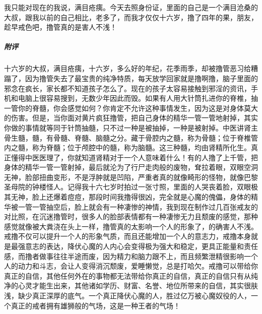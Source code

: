 \begin{case}
    我只能对现在的我说，满目疮痍。今天去照身份证，里面的自己是一个满目沧桑的大叔，跟我以前的自己相比，老多了，而我才仅仅十六岁，撸了四年的果，朋友，趁早戒色吧，撸管真的是害人不浅！
    \subparagraph{附评} 十六岁的大叔，满目疮痍，十六岁，多么好的年纪，花季雨季，却被撸管恶习给糟蹋了，因为撸管失去了最宝贵的纯净特质，每天放学回家就是撸啊撸，脑子里面的邪念在疯长，家长都不知道孩子怎么了。现在的孩子太容易接触到邪淫的资讯，手机和电脑上很容易搜到，无数少年因此而毁。如果有人用大针筒扎进你的脊椎，抽一管你的脊髓，你会感觉如何？你肯定不允许这种事情发生，因为这是对身体莫大的伤害。但是，当你面对黄片疯狂撸管，把自己身体的精华一管一管地射掉，其实你做的事情就等同于针筒抽髓，只不过一种是被抽掉，一种是被射掉。中医讲肾主骨生髓，髓，有骨髓、脊髓、脑髓之分。藏于骨腔内之髓，称为骨髓；位于脊椎管内之髓，称为脊髓；位于颅腔中的髓，称为脑髓。这三种髓，均由肾精所化生。真正懂得中医医理了，你就知道肾精对于一个人意味着什么！有的人撸了上千管，把身体的精华一管一管射掉，最后就沦为了行尸走肉般的废物，耷拉着眼，双眼空洞无神，脸部扭曲变形，不是浮肿就是凹陷，严重者真的就像畸形的怪物，就像巴黎圣母院的钟楼怪人。记得我十六七岁时拍过一张寸照，里面的人哭丧着脸，双眼极其无神，脸上还爆着痘痘，那段时间我撸得很凶，完全就是心魔的傀儡，身体的精华被一管一管抽空后，脸上就会有一种凄惨的神情，我到现在制作过几百张戒友的对比照，在沉迷撸管时，很多人的脸部表情都有一种凄惨无力且颓废的感觉，那种感觉就像被大粪浇在头上一样，撸管真的太影响一个人的形象了，的确害人不浅。戒撸不仅可以提升一个人的形象气质，而且还能增加一个人的意志力，戒撸本身就是最强意志的表达，降伏心魔的人内心会变得极为强大和稳定，更具正能量和责任感，而撸者做事往往半途而废，因为精力和脑力跟不上，而且频繁泄精很影响一个人的动力和斗志，会让人变得消沉颓废，爱睡懒觉，总是打哈欠。戒撸可以带给你真正的自信，其他任何外在的事物都无法带给你真正的自信，真正的自信只有从纯净的心灵才能生出来，其他诸如学历、财富、名誉、地位所带来的自信，其实很肤浅，缺少真正深厚的底气。一个真正降伏心魔的人，胜过亿万被心魔奴役的人，一个真正的戒者拥有雄狮般的气场，这是一种王者的气场！
\end{case}

